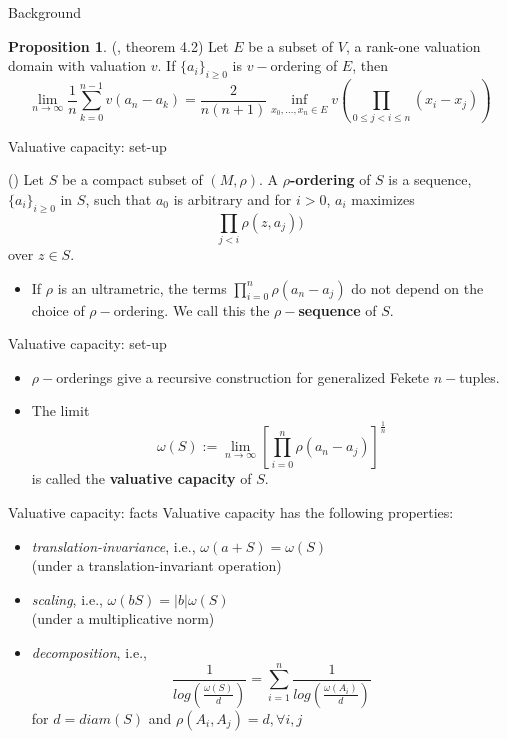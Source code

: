 \documentclass{beamer}
\theoremstyle{definition}
\newtheorem*{proposition*}{Proposition}
\begin{document}
\begin{frame}{Background}
\begin{proposition*}
	(\cite{jlc}, theorem 4.2)	Let $E$ be a subset of $V$, a rank-one valuation domain with valuation $v$. If $\{a_i\}_{i \geq 0}$ is $v-$ordering of $E$, then
	\[\lim_{n\to\infty} \frac{1}{n} \sum_{k=0}^{n-1} v(a_n-a_k) =\frac{2}{n(n+1)} \inf_{x_0, \ldots, x_n \in E} v (\prod_{0\leq j < i \leq n} (x_i-x_j))\]
\end{proposition*}
\end{frame}

\begin{frame}{Valuative capacity: set-up}
	\begin{definition}
		(\cite{kj}) Let $S$ be a compact subset of $(M,\rho)$. A \textbf{$\rho$-ordering} of $S$ is a sequence, $\{a_i\}_{i\geq 0}$ in $S$, such that $a_0$ is arbitrary and for $i >0$, $a_i$ maximizes 
		\[ \prod_{j < i} \rho(z, a_j) )\] over $z \in S$.\\
	\end{definition}
	\pause
    \begin{itemize}
	   \item If $\rho$ is an ultrametric, the terms $\prod_{i=0}^n \rho(a_n - a_j)$ do not depend on the choice of $\rho-$ordering. We call this the \textbf{$\rho-$sequence} of $S$. \\
	\end{itemize}
\end{frame}

\begin{frame}{Valuative capacity: set-up}
	\begin{itemize}
		\item $\rho-$orderings give a recursive construction for generalized Fekete $n-$tuples.\\	
		\pause	
		\item The limit \[ \omega(S):= \lim_{n\to\infty} [\prod_{i=0}^n \rho(a_n - a_j)]^{\frac{1}{n}}\] is called the \textbf{valuative capacity} of $S$.
	\end{itemize}		  
\end{frame}

\begin{frame}{Valuative capacity: facts}
Valuative capacity has the following properties:
\begin{itemize}
	\item \textit{translation-invariance}, i.e., $\omega(a+S) = \omega(S)$\\ (under a translation-invariant operation)
	\pause
	\item \textit{scaling}, i.e., $\omega(bS) = \lvert b\rvert \omega(S)$\\ (under a multiplicative norm)
	\pause
	\item \textit{decomposition}, i.e., \[\frac{1}{log(\frac{\omega(S)}{d}) } = \sum_{i=1}^n \frac{1}{log(\frac{\omega(A_i)}{d})}\]
	for $d=diam(S)$ and $\rho(A_i, A_j)=d, \forall i,j$ 
\end{itemize}	
\end{frame}
\end{document}
